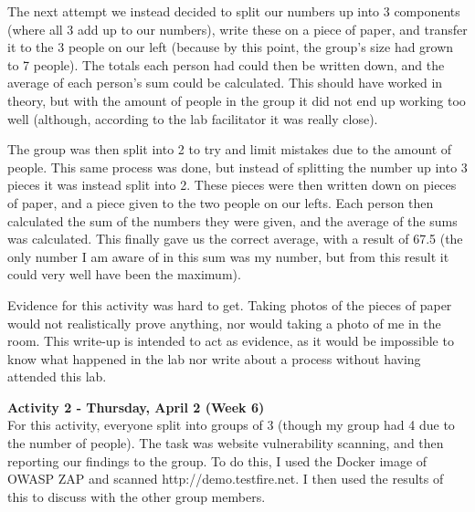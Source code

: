\documentclass[titlepage]{article}
\begin{document}
        \vspace{0.5em}

        The next attempt we instead decided to split our numbers up into 3
        components (where all 3 add up to our numbers), write these on a piece
        of paper, and transfer it to the 3 people on our left (because by this
        point, the group's size had grown to 7 people). The totals each person
        had could then be written down, and the average of each person's sum
        could be calculated. This should have worked in theory, but with the
        amount of people in the group it did not end up working too well
        (although, according to the lab facilitator it was really close).

        \vspace{0.5em}

        The group was then split into 2 to try and limit mistakes due to the
        amount of people. This same process was done, but instead of splitting
        the number up into 3 pieces it was instead split into 2. These pieces
        were then written down on pieces of paper, and a piece given to the two
        people on our lefts. Each person then calculated the sum of the numbers
        they were given, and the average of the sums was calculated. This
        finally gave us the correct average, with a result of 67.5 (the only
        number I am aware of in this sum was my number, but from this result it
        could very well have been the maximum).

        \vspace{0.5em}

        Evidence for this activity was hard to get. Taking photos of the pieces
        of paper would not realistically prove anything, nor would taking a
        photo of me in the room. This write-up is intended to act as evidence,
        as it would be impossible to know what happened in the lab nor write
        about a process without having attended this lab.

        \bigskip

        \textbf{Activity 2 - Thursday, April 2 (Week 6)} \\
        For this activity, everyone split into groups of 3 (though my group had
        4 due to the number of people). The task was website vulnerability
        scanning, and then reporting our findings to the group. To do this, I
        used the Docker image of OWASP ZAP and scanned http://demo.testfire.net.
        I then used the results of this to discuss with the other group members.
\end{document}
